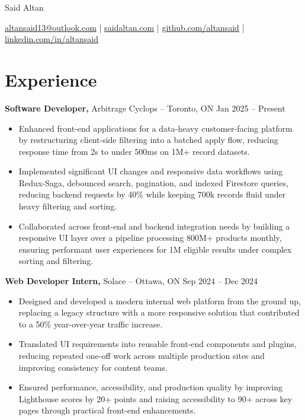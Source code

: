 \documentclass[11pt]{article}       %
\begin{document}
\centerline{\Huge Said Altan}

\vspace{10pt}

\centerline{\href{mailto:altansaid13@outlook.com}{altansaid13@outlook.com} | \href{https://saidaltan.com}{saidaltan.com} | \href{https://github.com/altansaid}{github.com/altansaid} | \href{https://www.linkedin.com/in/altansaid}{linkedin.com/in/altansaid}}


\vspace{5pt}
\section*{Experience}
\textbf{Software Developer,} {Arbitrage Cyclops} -- Toronto, ON \hfill Jan 2025 -- Present \\
\vspace{-9pt}
\begin{itemize}
  \item Enhanced front-end applications for a data-heavy customer-facing platform by restructuring client-side filtering into a batched apply flow, reducing response time from 2s to under 500ms on 1M+ record datasets.
  \item Implemented significant UI changes and responsive data workflows using Redux-Saga, debounced search, pagination, and indexed Firestore queries, reducing backend requests by 40\% while keeping 700k records fluid under heavy filtering and sorting.
  \item Collaborated across front-end and backend integration needs by building a responsive UI layer over a pipeline processing 800M+ products monthly, ensuring performant user experiences for 1M eligible results under complex sorting and filtering.
\end{itemize}

\textbf{Web Developer Intern,} {Solace} -- Ottawa, ON \hfill Sep 2024 -- Dec 2024 \\
\vspace{-9pt}
\begin{itemize}
  \item Designed and developed a modern internal web platform from the ground up, replacing a legacy structure with a more responsive solution that contributed to a 50\% year-over-year traffic increase.
  \item Translated UI requirements into reusable front-end components and plugins, reducing repeated one-off work across multiple production sites and improving consistency for content teams.
  \item Ensured performance, accessibility, and production quality by improving Lighthouse scores by 20+ points and raising accessibility to 90+ across key pages through practical front-end enhancements.
\end{itemize}
\end{document}
